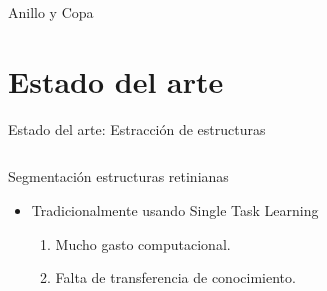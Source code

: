 \documentclass[xcolor=dvipsnames,table]{beamer}
\begin{document}
\begin{frame}
\begin{center}
{\begin{minipage}[c]{0.1\linewidth}
			\footnotesize Anillo y Copa
		\end{minipage}%
	}
\end{center}



\end{frame}



\section{Estado del arte}
\begin{frame}{Estado del arte: Estracción de estructuras}
	\begin{columns}[c]
		\begin{block}{Segmentación estructuras retinianas}
			\begin{itemize}
				\item Tradicionalmente usando Single Task Learning
				\begin{enumerate}
					\item Mucho gasto computacional.
					\item Falta de transferencia de conocimiento.
				\end{enumerate}
			\end{itemize}
		\end{block}
		

\end{columns}
\end{frame}
\end{document}
